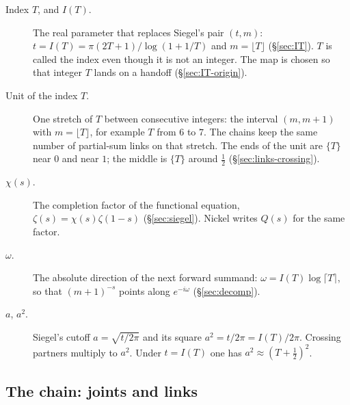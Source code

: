 \documentclass[11pt]{article}
\theoremstyle{definition}
\begin{document}
\begin{description}
\item[Index $T$, and $I(T)$.]
The real parameter that replaces Siegel's pair $(t,m)$:
$t=I(T)=\pi(2T+1)/\log(1+1/T)$ and $m=\lfloor T\rfloor$
(\S\ref{sec:IT}).
$T$ is called the index even though it is not an integer.
The map is chosen so that integer $T$ lands on a handoff
(\S\ref{sec:IT-origin}).

\item[Unit of the index $T$.]
One stretch of $T$ between consecutive integers: the interval
$(m,m+1)$ with $m=\lfloor T\rfloor$, for example $T$ from $6$ to $7$.
The chains keep the same number of partial-sum links on that stretch.
The ends of the unit are $\{T\}$ near $0$ and near $1$; the middle is
$\{T\}$ around $\tfrac12$
(\S\ref{sec:links-crossing}).

\item[$\chi(s)$.]
The completion factor of the functional equation,
$\zeta(s)=\chi(s)\zeta(1-s)$
(\S\ref{sec:siegel}).
Nickel writes $Q(s)$ for the same factor.

\item[$\omega$.]
The absolute direction of the next forward summand:
$\omega=I(T)\log\lceil T\rceil$, so that $(m+1)^{-s}$ points along
$e^{-i\omega}$
(\S\ref{sec:decomp}).

\item[$a$, $a^{2}$.]
Siegel's cutoff $a=\sqrt{t/2\pi}$ and its square
$a^{2}=t/2\pi=I(T)/2\pi$.
Crossing partners multiply to $a^{2}$.
Under $t=I(T)$ one has $a^{2}\approx(T+\tfrac12)^{2}$.
\end{description}

\subsection*{The chain: joints and links}
\end{document}
